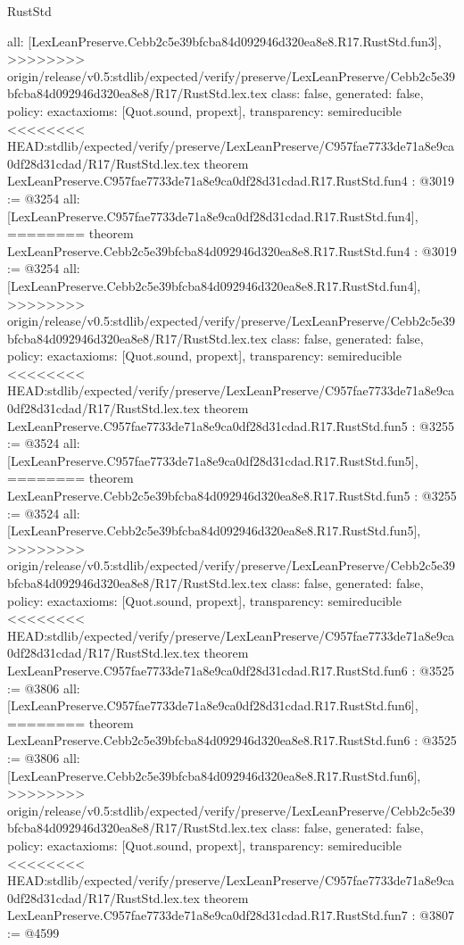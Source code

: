 \begin{lexlean}{RustStd}
\begin{coremodule}
{\begin{coremodule}
{{{{{{{  all: [LexLeanPreserve.Cebb2c5e39bfcba84d092946d320ea8e8.R17.RustStd.fun3],
>>>>>>>> origin/release/v0.5:stdlib/expected/verify/preserve/LexLeanPreserve/Cebb2c5e39bfcba84d092946d320ea8e8/R17/RustStd.lex.tex
  class: false,
  generated: false,
  policy: exact{axioms: [Quot.sound, propext]},
  transparency: semireducible
}
<<<<<<<< HEAD:stdlib/expected/verify/preserve/LexLeanPreserve/C957fae7733de71a8e9ca0df28d31cdad/R17/RustStd.lex.tex
theorem LexLeanPreserve.C957fae7733de71a8e9ca0df28d31cdad.R17.RustStd.fun4 : @3019 := @3254 {
  all: [LexLeanPreserve.C957fae7733de71a8e9ca0df28d31cdad.R17.RustStd.fun4],
========
theorem LexLeanPreserve.Cebb2c5e39bfcba84d092946d320ea8e8.R17.RustStd.fun4 : @3019 := @3254 {
  all: [LexLeanPreserve.Cebb2c5e39bfcba84d092946d320ea8e8.R17.RustStd.fun4],
>>>>>>>> origin/release/v0.5:stdlib/expected/verify/preserve/LexLeanPreserve/Cebb2c5e39bfcba84d092946d320ea8e8/R17/RustStd.lex.tex
  class: false,
  generated: false,
  policy: exact{axioms: [Quot.sound, propext]},
  transparency: semireducible
}
<<<<<<<< HEAD:stdlib/expected/verify/preserve/LexLeanPreserve/C957fae7733de71a8e9ca0df28d31cdad/R17/RustStd.lex.tex
theorem LexLeanPreserve.C957fae7733de71a8e9ca0df28d31cdad.R17.RustStd.fun5 : @3255 := @3524 {
  all: [LexLeanPreserve.C957fae7733de71a8e9ca0df28d31cdad.R17.RustStd.fun5],
========
theorem LexLeanPreserve.Cebb2c5e39bfcba84d092946d320ea8e8.R17.RustStd.fun5 : @3255 := @3524 {
  all: [LexLeanPreserve.Cebb2c5e39bfcba84d092946d320ea8e8.R17.RustStd.fun5],
>>>>>>>> origin/release/v0.5:stdlib/expected/verify/preserve/LexLeanPreserve/Cebb2c5e39bfcba84d092946d320ea8e8/R17/RustStd.lex.tex
  class: false,
  generated: false,
  policy: exact{axioms: [Quot.sound, propext]},
  transparency: semireducible
}
<<<<<<<< HEAD:stdlib/expected/verify/preserve/LexLeanPreserve/C957fae7733de71a8e9ca0df28d31cdad/R17/RustStd.lex.tex
theorem LexLeanPreserve.C957fae7733de71a8e9ca0df28d31cdad.R17.RustStd.fun6 : @3525 := @3806 {
  all: [LexLeanPreserve.C957fae7733de71a8e9ca0df28d31cdad.R17.RustStd.fun6],
========
theorem LexLeanPreserve.Cebb2c5e39bfcba84d092946d320ea8e8.R17.RustStd.fun6 : @3525 := @3806 {
  all: [LexLeanPreserve.Cebb2c5e39bfcba84d092946d320ea8e8.R17.RustStd.fun6],
>>>>>>>> origin/release/v0.5:stdlib/expected/verify/preserve/LexLeanPreserve/Cebb2c5e39bfcba84d092946d320ea8e8/R17/RustStd.lex.tex
  class: false,
  generated: false,
  policy: exact{axioms: [Quot.sound, propext]},
  transparency: semireducible
}
<<<<<<<< HEAD:stdlib/expected/verify/preserve/LexLeanPreserve/C957fae7733de71a8e9ca0df28d31cdad/R17/RustStd.lex.tex
theorem LexLeanPreserve.C957fae7733de71a8e9ca0df28d31cdad.R17.RustStd.fun7 : @3807 := @4599 {
}}}}}}}}}}
\end{coremodule}}
\end{coremodule}
\end{lexlean}
